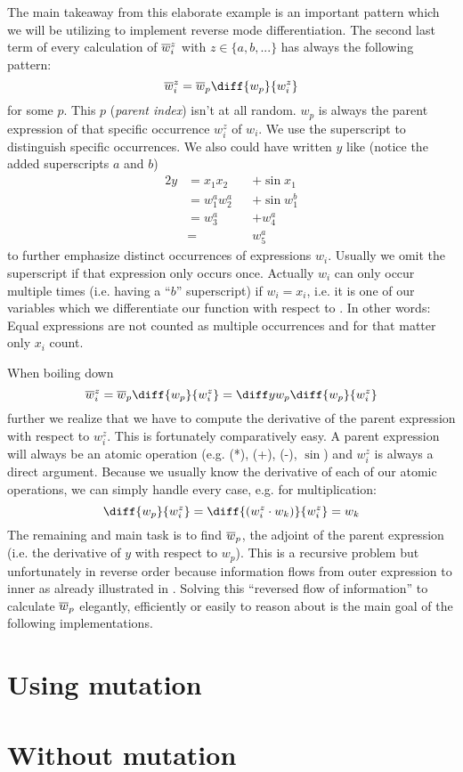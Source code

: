 The main takeaway from this elaborate \todowording example is an important pattern which we will be utilizing to implement reverse mode differentiation. The second last term of every calculation of $\overline{w}_{i}^z$ with $z \in \{a, b, ...\}$  has always the following pattern:
\newcommand{\defoverwiz}{\overw{i}^z = \overw{p}\diff{w_p}{w_i^z}}
\[ \defoverwiz \]
for some $p$. This $p$ (\emph{parent index}) isn't at all random. $w_p$ is always the parent expression of that specific occurrence $w_i^z$ of $w_i$. We use the superscript to distinguish specific occurrences. We also could have written $y$ like (notice the added superscripts $a$ and $b$)
\begin{alignat*}{2}
    y & = x_1x_2 &  & + \sin{x_1} \\
      & = w_1^a w_2^a &  & + \sin{w_1^b} \\
      & = w_3^a    &  & + w_4^a       \\
      & =        &  & w_5^a
\end{alignat*}
to further emphasize distinct occurrences of expressions $w_i$. Usually we omit the superscript if that expression only occurs once. Actually $w_i$ can only occur multiple times (i.e. having a ``$b$'' superscript) if $w_i = x_i$, i.e. it is one of our variables which we differentiate our function with respect to \todogrammar. In other words: Equal expressions are not counted as multiple occurrences and for that matter only $x_i$ count.

When boiling down
\[ \overw{i}^z = \overw{p}\diff{w_p}{w_i^z} = \diffyw{p}\diff{w_p}{w_i^z} \]
further we realize that we have to compute the derivative of the parent expression with respect to $w_i^z$. This is fortunately comparatively easy. A parent expression will always be an atomic operation (e.g. (*), (+), (-), $\sin$) and $w_i^z$ is always a direct argument. Because we usually know the derivative of each of our atomic operations, we can simply handle every case, e.g. for multiplication:
\[ \diff{w_p}{w_i^z} = \diff{(w_i^z \cdot w_k)}{w_i^z} = w_k \]
The remaining and main task is to find $\overline{w}_{p}$, \todopunctuation the adjoint of the parent expression (i.e. the derivative of $y$ with respect to $w_p$). This is a recursive problem but unfortunately in reverse order because information flows from outer expression to inner  as already illustrated in . Solving this ``reversed flow of information'' to calculate $\overline{w}_{p}$ elegantly, efficiently or easily to reason about is the main goal of the following implementations. 


\section{Using mutation}



\section{Without mutation}
